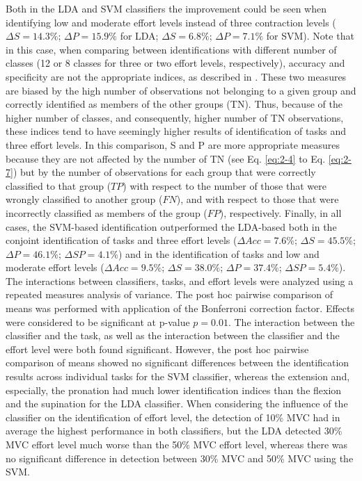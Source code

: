 Both in the LDA and SVM classifiers the improvement could be seen when identifying low and moderate effort levels instead of three contraction levels ($\Delta S= 14.3\%$; $\Delta P= 15.9\%$ for LDA; $\Delta S= 6.8\%$; $\Delta P= 7.1\%$ for SVM). Note that in this case, when comparing between identifications with different number of classes (12 or 8 classes for three or two effort levels, respectively), accuracy and specificity are not the appropriate indices, as described in \citep{Rojas-Martinez2013}. These two measures are biased by the high number of observations not belonging to a given group and correctly identified as members of the other groups (TN). Thus, because of the higher number of classes, and consequently, higher number of TN observations, these indices tend to have seemingly higher results of identification of tasks and three effort levels. In this comparison, S and P are more appropriate measures because they are not affected by the number of TN (see Eq. \ref{eq:2-4} to Eq. \ref{eq:2-7}) but by the number of observations for each group that were correctly classified to that group ($TP$) with respect to the number of those that were wrongly classified to another group ($FN$), and with respect to those that were incorrectly classified as members of the group ($FP$), respectively.
Finally, in all cases, the SVM-based identification outperformed the LDA-based both in the conjoint identification of tasks and three effort levels ($\Delta Acc= 7.6\%$; $\Delta S= 45.5\%$; $\Delta P= 46.1\%$; $\Delta SP= 4.1\%$) and in the identification of tasks and low and moderate effort levels ($\Delta Acc= 9.5\%$; $\Delta S= 38.0\%$; $\Delta P= 37.4\%$; $\Delta SP= 5.4\%$).
The interactions between classifiers, tasks, and effort levels were analyzed using a repeated measures analysis of variance. The post hoc pairwise comparison of means was performed with application of the Bonferroni correction factor. Effects were considered to be significant at p-value $p=0.01$. The interaction between the classifier and the task, as well as the interaction between the classifier and the effort level were both found significant. However, the post hoc pairwise comparison of means showed no significant differences between the identification results across individual tasks for the SVM classifier, whereas the extension and, especially, the pronation had much lower identification indices than the flexion and the supination for the LDA classifier. When considering the influence of the classifier on the identification of effort level, the detection of 10\% MVC had in average the highest performance in both classifiers, but the LDA detected 30\% MVC effort level much worse than the 50\% MVC effort level, whereas there was no significant difference in detection between 30\% MVC and 50\% MVC using the SVM.


